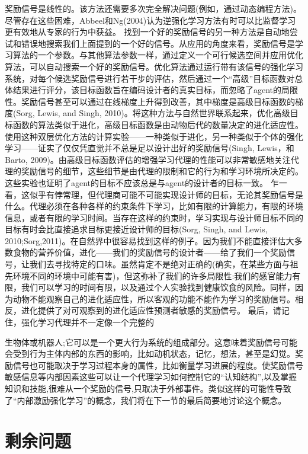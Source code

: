 奖励信号是线性的。该方法还需要多次完全解决问题(例如，通过动态编程方法)。尽管存在这些困难，Abbeel和Ng(2004)认为逆强化学习方法有时可以比监督学习更有效地从专家的行为中获益。
找到一个好的奖励信号的另一种方法是自动地尝试和错误地搜索我们上面提到的一个好的信号。从应用的角度来看，奖励信号是学习算法的一个参数。与其他算法参数一样，通过定义一个可行候选空间并应用优化算法，可以自动搜索一个好的奖励信号。优化算法通过运行带有该信号的强化学习系统，对每个候选奖励信号进行若干步的评估，然后通过一个“高级”目标函数对总体结果进行评分，该目标函数旨在编码设计者的真实目标，而忽略了agent的局限性。奖励信号甚至可以通过在线梯度上升得到改善，其中梯度是高级目标函数的梯度(Sorg, Lewis, and Singh, 2010)。将这种方法与自然世界联系起来，优化高级目标函数的算法类似于进化，高级目标函数是由动物后代的数量决定的进化适应性。
使用这种双层优化方法的计算实验——一种类似于进化，另一种类似于个体的强化学习——证实了仅仅凭直觉并不总是足以设计出好的奖励信号(Singh, Lewis，和Barto, 2009)。由高级目标函数评估的增强学习代理的性能可以非常敏感地关注代理的奖励信号的细节，这些细节是由代理的限制和它的行为和学习环境所决定的。这些实验也证明了agent的目标不应该总是与agent的设计者的目标一致。
乍一看，这似乎有悖常理，但代理商可能不可能实现设计师的目标，无论其奖励信号是什么。代理必须在各种各样的约束条件下学习，比如有限的计算能力，有限的环境信息，或者有限的学习时间。当存在这样的约束时，学习实现与设计师目标不同的目标有时会比直接追求目标更接近设计师的目标(Sorg, Singh, and Lewis, 2010;Sorg,2011)。在自然界中很容易找到这样的例子。因为我们不能直接评估大多数食物的营养价值，进化——我们的奖励信号的设计者——给了我们一个奖励信号，让我们去寻找特定的口味。虽然肯定不是绝对正确的(确实，在某些方面与祖先环境不同的环境中可能有害)，但这弥补了我们的许多局限性:我们的感官能力有限，我们可以学习的时间有限，以及通过个人实验找到健康饮食的风险。同样，因为动物不能观察自己的进化适应性，所以客观的功能不能作为学习的奖励信号。相反，进化提供了对可观察到的进化适应性预测者敏感的奖励信号。
最后，请记住，强化学习代理并不一定像一个完整的

生物体或机器人;它可以是一个更大行为系统的组成部分。这意味着奖励信号可能会受到行为主体内部的东西的影响，比如动机状态，记忆，想法，甚至是幻觉。奖励信号也可能取决于学习过程本身的属性，比如衡量学习进展的程度。使奖励信号敏感信息等内部因素这些可以让一个代理学习如何控制它的“认知结构”,以及掌握知识和技能,很难从一个奖励的信号,只取决于外部事件。类似这样的可能性导致了“内部激励强化学习”的概念，我们将在下一节的最后简要地讨论这个概念。


\section{剩余问题}

